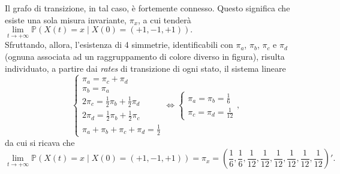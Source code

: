 \documentclass[11pt,largemargins]{homework}
\begin{document}
\begin{alphaparts}
\begin{itemize}
  Il grafo di transizione, in tal caso, è fortemente connesso. Questo significa che esiste una sola misura invariante, $\pi_{x}$, a cui tenderà $\lim\limits_{t \rightarrow +\infty}\mathbb{P}\left(X\left(t\right)=x\mid X\left(0\right)=\left(+1,-1,+1\right)\right).$\\
  Sfruttando, allora, l'esistenza di 4 simmetrie, identificabili con $\pi_{a}$, $\pi_{b}$, $\pi_{c}$ e $\pi_{d}$ (ognuna associata ad un raggruppamento di colore diverso in figura), risulta individuato, a partire dai \emph{rates} di transizione di ogni stato, il sistema lineare 
  \begin{equation*}
  \begin{cases}\pi_{a}=\pi_{c}+\pi_{d}\\
  \pi_{b}=\pi_{a}\\
  2\pi_{c}=\frac{1}{2}\pi_{b}+\frac{1}{2}\pi_{d}\\
   2\pi_{d}=\frac{1}{2}\pi_{b}+\frac{1}{2}\pi_{c}\\
  \pi_{a}+\pi_{b}+\pi_{c}+\pi_{d}=\frac{1}{2}\end{cases}
  \Leftrightarrow
  \begin{cases}\pi_{a}=\pi_{b}=\frac{1}{6}\\
  \pi_{c}=\pi_{d}=\frac{1}{12}\end{cases},
  \end{equation*}
  da cui si ricava che
  \begin{equation*}
  \lim\limits_{t \rightarrow +\infty}\mathbb{P}\left(X\left(t\right)=x\mid X\left(0\right)=\left(+1,-1,+1\right)\right)=\pi_{x}=\left(\frac{1}{6},\frac{1}{6},\frac{1}{12},\frac{1}{12},\frac{1}{12},\frac{1}{12},\frac{1}{12},\frac{1}{12}\right)'.
  \end{equation*}
  

\end{itemize}
\end{alphaparts}
\end{document}
